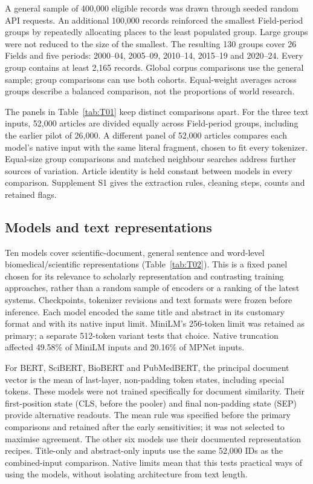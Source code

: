 \documentclass[12pt]{article}
\begin{document}
A general sample of 400,000 eligible records was drawn through seeded random API requests. An additional 100,000 records reinforced the smallest Field-period groups by repeatedly allocating places to the least populated group. Large groups were not reduced to the size of the smallest. The resulting 130 groups cover 26 Fields and five periods: 2000--04, 2005--09, 2010--14, 2015--19 and 2020--24. Every group contains at least 2,165 records. Global corpus comparisons use the general sample; group comparisons can use both cohorts. Equal-weight averages across groups describe a balanced comparison, not the proportions of world research.

The panels in Table~\ref{tab:T01} keep distinct comparisons apart. For the three text inputs, 52,000 articles are divided equally across Field-period groups, including the earlier pilot of 26,000. A different panel of 52,000 articles compares each model's native input with the same literal fragment, chosen to fit every tokenizer. Equal-size group comparisons and matched neighbour searches address further sources of variation. Article identity is held constant between models in every comparison. Supplement S1 gives the extraction rules, cleaning steps, counts and retained flags.


\subsection{Models and text representations}
Ten models cover scientific-document, general sentence and word-level biomedical/scientific representations (Table~\ref{tab:T02}). This is a fixed panel chosen for its relevance to scholarly representation and contrasting training approaches, rather than a random sample of encoders or a ranking of the latest systems. Checkpoints, tokenizer revisions and text formats were frozen before inference. Each model encoded the same title and abstract in its customary format and with its native input limit. MiniLM's 256-token limit was retained as primary; a separate 512-token variant tests that choice. Native truncation affected 49.58\% of MiniLM inputs and 20.16\% of MPNet inputs.

For BERT, SciBERT, BioBERT and PubMedBERT, the principal document vector is the mean of last-layer, non-padding token states, including special tokens. These models were not trained specifically for document similarity. Their first-position state (CLS, before the pooler) and final non-padding state (SEP) provide alternative readouts. The mean rule was specified before the primary comparisons and retained after the early sensitivities; it was not selected to maximise agreement. The other six models use their documented representation recipes. Title-only and abstract-only inputs use the same 52,000 IDs as the combined-input comparison. Native limits mean that this tests practical ways of using the models, without isolating architecture from text length.

\end{document}
